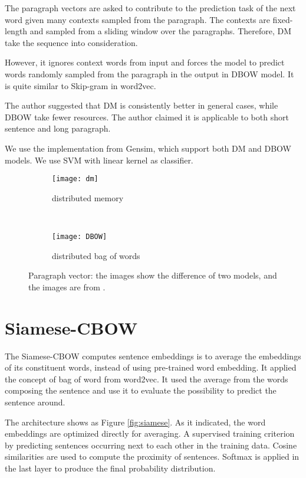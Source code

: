 The paragraph vectors are asked to contribute to the prediction task of the next word given many contexts sampled from the paragraph.
The contexts are fixed-length and sampled from a sliding window over the paragraphs. Therefore, DM take the sequence into consideration.

However, it ignores context words from input and forces the model to predict words randomly sampled from the paragraph in the output in DBOW model.
It is quite similar to Skip-gram in word2vec.

The author suggested that DM is consistently better in general cases, while DBOW take fewer resources. 
The author claimed it is applicable to both short sentence and long paragraph.

We use the implementation from Gensim, which support both DM and DBOW models. We use SVM with linear kernel as classifier.

\begin{figure}
\centering
\begin{subfigure}{.5\textwidth}
  \centering
  \texttt{[image: dm]}
  \caption{distributed memory}
  \label{fig:dm}
\end{subfigure}~
\begin{subfigure}{.5\textwidth}
  \centering
  \texttt{[image: DBOW]}
  \caption{distributed bag of words}
  \label{fig:dbow}
\end{subfigure}
\caption{Paragraph vector: the images show the difference of two models, and the images are from \cite{PVDM}.}
\label{fig:PVDM}
\end{figure}

\section{Siamese-CBOW}

The Siamese-CBOW\cite{kenter2016siamesecbow} computes sentence embeddings is to average the embeddings of its constituent words, instead of using pre-trained word embedding. It applied the concept of bag of word from word2vec. 
It used the average from the words composing the sentence and use it to evaluate the possibility to predict the sentence around. 

The architecture shows as Figure \ref{fig:siamese}. As it indicated, the word embeddings are optimized directly for averaging.
A supervised training criterion by predicting sentences occurring next to each other in the training data.
Cosine similarities are used to compute the proximity of sentences.
Softmax is applied in the last layer to produce the final probability distribution.

